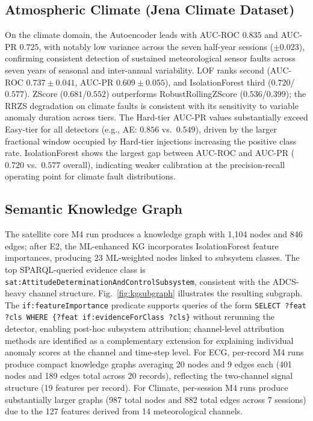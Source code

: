 \documentclass[conference]{IEEEtran}
\begin{document}
\subsection{Atmospheric Climate (Jena Climate Dataset)}

On the climate domain, the Autoencoder leads with AUC-ROC $0.835$ and AUC-PR $0.725$, with notably low variance across the seven half-year sessions ($\pm 0.023$), confirming consistent detection of sustained meteorological sensor faults across seven years of seasonal and inter-annual variability. LOF ranks second (AUC-ROC $0.737 \pm 0.041$, AUC-PR $0.609 \pm 0.055$), and IsolationForest third ($0.720$/$0.577$). ZScore ($0.681$/$0.552$) outperforms RobustRollingZScore ($0.536$/$0.399$); the RRZS degradation on climate faults is consistent with its sensitivity to variable anomaly duration across tiers. The Hard-tier AUC-PR values substantially exceed Easy-tier for all detectors (e.g., AE: $0.856$ vs.\ $0.549$), driven by the larger fractional window occupied by Hard-tier injections increasing the positive class rate. IsolationForest shows the largest gap between AUC-ROC and AUC-PR ($0.720$ vs.\ $0.577$ overall), indicating weaker calibration at the precision-recall operating point for climate fault distributions.

\subsection{Semantic Knowledge Graph}

The satellite core M4 run produces a knowledge graph with 1,104 nodes and 846 edges; after E2, the ML-enhanced KG incorporates IsolationForest feature importances, producing 23 ML-weighted nodes linked to subsystem classes. The top SPARQL-queried evidence class is \texttt{sat:AttitudeDeterminationAndControlSubsystem}, consistent with the ADCS-heavy channel structure. Fig.~\ref{fig:kgsubgraph} illustrates the resulting subgraph. The \texttt{if:featureImportance} predicate supports queries of the form \texttt{SELECT ?feat ?cls WHERE \{?feat if:evidenceForClass ?cls\}} without rerunning the detector, enabling post-hoc subsystem attribution; channel-level attribution methods \cite{condattrib2026,multiviewae2026} are identified as a complementary extension for explaining individual anomaly scores at the channel and time-step level. For ECG, per-record M4 runs produce compact knowledge graphs averaging 20 nodes and 9 edges each (401 nodes and 189 edges total across 20 records), reflecting the two-channel signal structure (19 features per record). For Climate, per-session M4 runs produce substantially larger graphs (987 total nodes and 882 total edges across 7 sessions) due to the 127 features derived from 14 meteorological channels.
\end{document}
